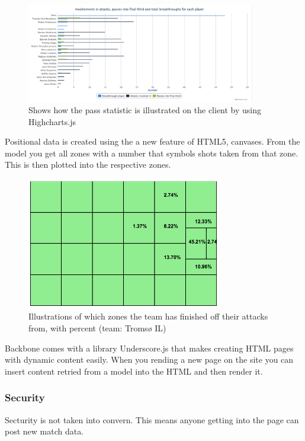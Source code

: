 \begin{figure}[ht!]
\centering
\includegraphics[width=100mm]{images/general/chart_passes.png}
\caption{Shows how the pass statistic is illustrated on the client by using Highcharts.js}
\label{overflow}
\end{figure}


Positional data is created using the a new feature of HTML5, canvases. From the model you get all zones with a number that symbols shots taken from that zone. This is then plotted into the respective zones. 

\begin{figure}[ht!]
\centering
\includegraphics[width=85mm]{images/general/finishing_zones.png}
\caption{Illustrations of which zones the team has finished off their attacks from, with percent (team: Tromsø IL)}
\label{overflow}
\end{figure}

Backbone comes with a library Underscore.js that makes creating HTML pages with dynamic content easily. When you rending a new page on the site you can insert content retried from a model into the HTML and then render it.





\subsubsection{Security}
Secturity is not taken into convern. This means anyone getting into the page can post new match data. 